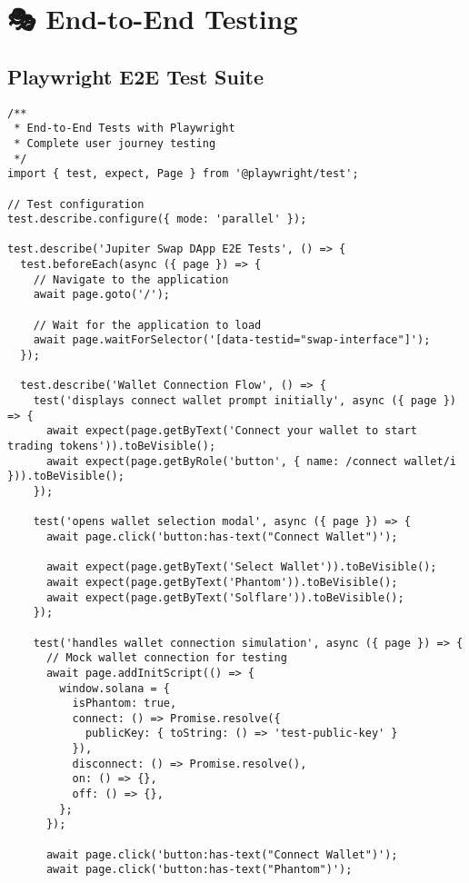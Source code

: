\documentclass[11pt,a4paper]{article}
\begin{document}
\section{🎭 End-to-End Testing}

\subsection{Playwright E2E Test Suite}

\begin{lstlisting}[style=typescript, caption=E2E Test Implementation]
/**
 * End-to-End Tests with Playwright
 * Complete user journey testing
 */
import { test, expect, Page } from '@playwright/test';

// Test configuration
test.describe.configure({ mode: 'parallel' });

test.describe('Jupiter Swap DApp E2E Tests', () => {
  test.beforeEach(async ({ page }) => {
    // Navigate to the application
    await page.goto('/');
    
    // Wait for the application to load
    await page.waitForSelector('[data-testid="swap-interface"]');
  });

  test.describe('Wallet Connection Flow', () => {
    test('displays connect wallet prompt initially', async ({ page }) => {
      await expect(page.getByText('Connect your wallet to start trading tokens')).toBeVisible();
      await expect(page.getByRole('button', { name: /connect wallet/i })).toBeVisible();
    });

    test('opens wallet selection modal', async ({ page }) => {
      await page.click('button:has-text("Connect Wallet")');
      
      await expect(page.getByText('Select Wallet')).toBeVisible();
      await expect(page.getByText('Phantom')).toBeVisible();
      await expect(page.getByText('Solflare')).toBeVisible();
    });

    test('handles wallet connection simulation', async ({ page }) => {
      // Mock wallet connection for testing
      await page.addInitScript(() => {
        window.solana = {
          isPhantom: true,
          connect: () => Promise.resolve({
            publicKey: { toString: () => 'test-public-key' }
          }),
          disconnect: () => Promise.resolve(),
          on: () => {},
          off: () => {},
        };
      });

      await page.click('button:has-text("Connect Wallet")');
      await page.click('button:has-text("Phantom")');


\end{lstlisting}
\end{document}
